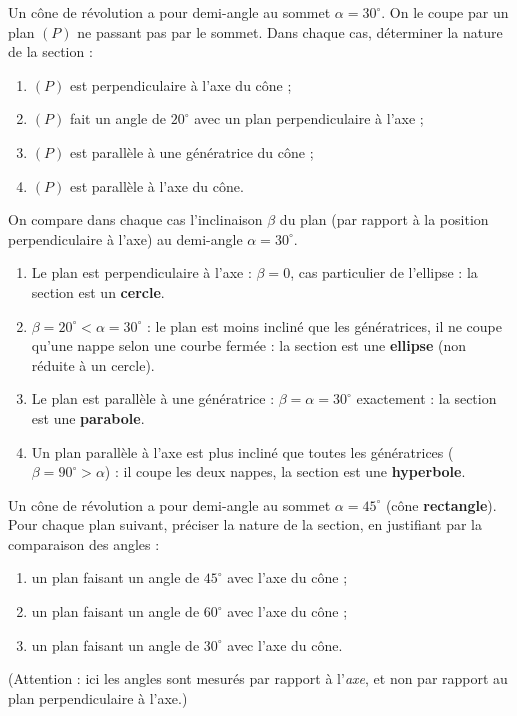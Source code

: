 \documentclass[11pt]{article}
\begin{document}
\begin{exoresolu}
Un cône de révolution a pour demi-angle au sommet $\alpha = 30^{\circ}$. On le coupe par un plan $(P)$ ne passant pas par le sommet. Dans chaque cas, déterminer la nature de la section :
\begin{enumerate}
\item $(P)$ est perpendiculaire à l'axe du cône ;
\item $(P)$ fait un angle de $20^{\circ}$ avec un plan perpendiculaire à l'axe ;
\item $(P)$ est parallèle à une génératrice du cône ;
\item $(P)$ est parallèle à l'axe du cône.
\end{enumerate}
\tcblower
On compare dans chaque cas l'inclinaison $\beta$ du plan (par rapport à la position perpendiculaire à l'axe) au demi-angle $\alpha = 30^{\circ}$.
\begin{enumerate}
\item Le plan est perpendiculaire à l'axe : $\beta = 0$, cas particulier de l'ellipse : la section est un \textbf{cercle}.
\item $\beta = 20^{\circ} < \alpha = 30^{\circ}$ : le plan est moins incliné que les génératrices, il ne coupe qu'une nappe selon une courbe fermée : la section est une \textbf{ellipse} (non réduite à un cercle).
\item Le plan est parallèle à une génératrice : $\beta = \alpha = 30^{\circ}$ exactement : la section est une \textbf{parabole}.
\item Un plan parallèle à l'axe est plus incliné que toutes les génératrices ($\beta = 90^{\circ} > \alpha$) : il coupe les deux nappes, la section est une \textbf{hyperbole}.
\end{enumerate}
\end{exoresolu}

\begin{exercice}
Un cône de révolution a pour demi-angle au sommet $\alpha = 45^{\circ}$ (cône \textbf{rectangle}). Pour chaque plan suivant, préciser la nature de la section, en justifiant par la comparaison des angles :
\begin{enumerate}
\item un plan faisant un angle de $45^{\circ}$ avec l'axe du cône ;
\item un plan faisant un angle de $60^{\circ}$ avec l'axe du cône ;
\item un plan faisant un angle de $30^{\circ}$ avec l'axe du cône.
\end{enumerate}
(Attention : ici les angles sont mesurés par rapport à l'\emph{axe}, et non par rapport au plan perpendiculaire à l'axe.)
\end{exercice}
\end{document}
